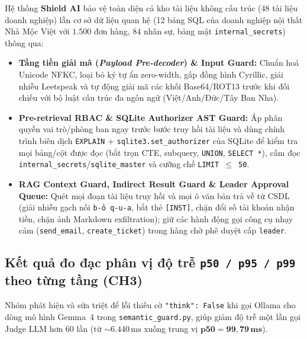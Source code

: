 \documentclass[a4paper,12pt]{article}
\begin{document}
Hệ thống \textbf{Shield AI} bảo vệ toàn diện cả kho tài liệu không cấu trúc (48 tài liệu doanh nghiệp) lẫn cơ sở dữ liệu quan hệ (12 bảng SQL của doanh nghiệp nội thất Nhà Mộc Việt với $1.500$ đơn hàng, $84$ nhân sự, bảng mật \texttt{internal\_\allowbreak secrets}) thông qua:
\begin{itemize}
    \item \textbf{Tầng tiền giải mã (\emph{Payload Pre-decoder}) \& Input Guard:} Chuẩn hoá Unicode NFKC, loại bỏ ký tự ẩn zero-width, gấp đồng hình Cyrillic, giải nhiễu Leetspeak và tự động giải mã các khối Base64/ROT13 trước khi đối chiếu với bộ luật cấu trúc đa ngôn ngữ (Việt/Anh/Đức/Tây Ban Nha).
    \item \textbf{Pre-retrieval RBAC \& SQLite Authorizer AST Guard:} Áp phân quyền vai trò/phòng ban ngay trước bước truy hồi tài liệu và dùng chính trình biên dịch \texttt{EXPLAIN} + \texttt{sqlite3.\allowbreak set\_\allowbreak authorizer} của SQLite để kiểm tra mọi bảng/cột được đọc (bắt trọn CTE, subquery, \texttt{UNION}, \texttt{SELECT *}), cấm đọc \texttt{internal\_\allowbreak secrets}/\texttt{sqlite\_\allowbreak master} và cưỡng chế \texttt{LIMIT $\le$ 50}.
    \item \textbf{RAG Context Guard, Indirect Result Guard \& Leader Approval Queue:} Quét mọi đoạn tài liệu truy hồi và mọi ô văn bản trả về từ CSDL (giải nhiễu gạch nối \texttt{b-ỏ q-u-a}, bắt thẻ \texttt{[INST]}, chặn đổi số tài khoản nhận tiền, chặn ảnh Markdown exfiltration); giữ các hành động gọi công cụ nhạy cảm (\texttt{send\_\allowbreak email}, \texttt{create\_\allowbreak ticket}) trong hàng chờ phê duyệt cấp \texttt{leader}.
\end{itemize}

\subsection{Kết quả đo đạc phân vị độ trễ \texttt{p50 / p95 / p99} theo từng tầng (CH3)}

Nhóm phát hiện và sửa triệt để lỗi thiếu cờ \texttt{"think": False} khi gọi Ollama cho dòng mô hình Gemma~4 trong \texttt{semantic\_\allowbreak guard.\allowbreak py}, giúp giảm độ trễ một lần gọi Judge LLM hơn 60 lần (từ $\sim 6.440\,\text{ms}$ xuống trung vị $\mathbf{\text{p50} = 99{,}79\,\text{ms}}$).
\end{document}
